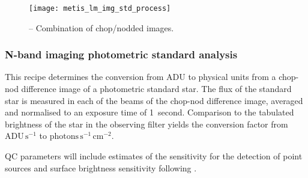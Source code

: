 \begin{figure}[hb]
  \centering
   \texttt{[image: metis\_lm\_img\_std\_process]}
  \caption[Recipe: ]{ --
    Combination of chop/nodded images.}
  \label{fig:metis_n_img_chopnod}
\end{figure}

\clearpage
\subsubsection{N-band imaging photometric standard analysis}
\label{n_img_std_process}
\label{rec:n_img_std_process}
\label{ssec:n_img_std_process}
\label{sssec:n_img_std_process}
\label{metis_n_img_std_process}
\label{rec:metis_n_img_std_process}
\label{sssec:metis_n_img_std_process}

This recipe determines the conversion from ADU to physical units from
a chop-nod difference image of a photometric standard star.  The flux
of the standard star is measured in each of the beams of the chop-nod
difference image, averaged and normalised to an exposure time of
1~second. Comparison to the tabulated brightness of the star in the
observing filter yields the conversion factor from
$\mathrm{ADU}\,\mathrm{s}^{-1}$ to
$\mathrm{photons}\,\mathrm{s}^{-1}\,\mathrm{cm}^{-2}$.

QC parameters will include estimates of the sensitivity for the
detection of point sources and surface brightness sensitivity
following \cite{visir_manual}.

